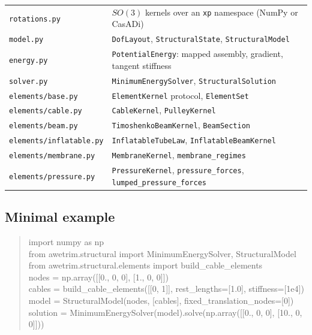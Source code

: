 \documentclass[11pt,a4paper]{article}
\newcommand{\code}[1]{\texttt{\small #1}}
\begin{document}
\begin{table}[H]
\centering
\small
\begin{tabular}{ll}
\toprule
\code{rotations.py} & $SO(3)$ kernels over an \code{xp} namespace (NumPy or CasADi)\\
\code{model.py} & \code{DofLayout}, \code{StructuralState}, \code{StructuralModel}\\
\code{energy.py} & \code{PotentialEnergy}: mapped assembly, gradient, tangent stiffness\\
\code{solver.py} & \code{MinimumEnergySolver}, \code{StructuralSolution}\\
\code{elements/base.py} & \code{ElementKernel} protocol, \code{ElementSet}\\
\code{elements/cable.py} & \code{CableKernel}, \code{PulleyKernel}\\
\code{elements/beam.py} & \code{TimoshenkoBeamKernel}, \code{BeamSection}\\
\code{elements/inflatable.py} & \code{InflatableTubeLaw}, \code{InflatableBeamKernel}\\
\code{elements/membrane.py} & \code{MembraneKernel}, \code{membrane\_regimes}\\
\code{elements/pressure.py} & \code{PressureKernel}, \code{pressure\_forces}, \code{lumped\_pressure\_forces}\\
\bottomrule
\end{tabular}
\end{table}

\subsection{Minimal example}

\begin{quote}\small\ttfamily
\noindent
import numpy as np\\
from awetrim.structural import MinimumEnergySolver, StructuralModel\\
from awetrim.structural.elements import build\_cable\_elements\\[4pt]
nodes = np.array([[0., 0, 0], [1., 0, 0]])\\
cables = build\_cable\_elements([[0, 1]], rest\_lengths=[1.0], stiffness=[1e4])\\
model = StructuralModel(nodes, [cables], fixed\_translation\_nodes=[0])\\
solution = MinimumEnergySolver(model).solve(np.array([[0., 0, 0], [10., 0, 0]]))
\end{quote}
\end{document}
